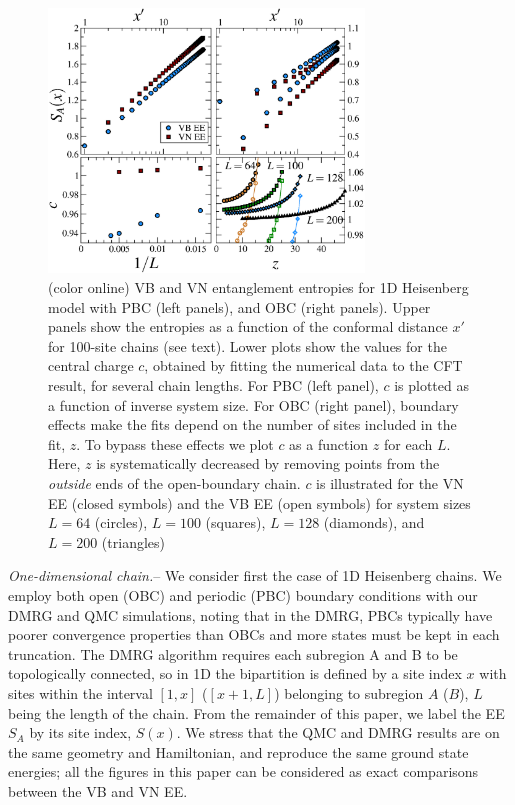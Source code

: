\documentclass[prl,aps,twocolumn,floatfix,amsmath,amssymb,superscriptaddress,tightenlines]{revtex4}
\begin{document}
\begin{figure} {
\includegraphics[width=3.3in]{4-panelFIG1.eps} \caption{(color online) VB
and VN entanglement entropies for 1D Heisenberg model with PBC (left
panels), and OBC (right panels). Upper panels show the entropies as a
function of the conformal distance $x'$ for 100-site chains (see text).
Lower plots show the values for the central charge $c$, obtained by
fitting the numerical data to the CFT result, for several chain lengths.
For PBC (left panel), $c$ is plotted as a function of inverse system size.
For OBC (right panel), boundary effects make the fits depend on the number
of sites included in the fit, $z$. To bypass these effects we plot $c$ as
a function $z$ for each $L$. Here, $z$ is systematically decreased by
removing points from the {\it outside} ends of the open-boundary chain.
$c$ is illustrated for the VN EE (closed symbols) and the VB EE (open
symbols) for system sizes $L=64$ (circles), $L=100$ (squares), $L=128$
(diamonds), and $L=200$ (triangles) \label{1D}}} \end{figure}

{\it One-dimensional chain.}-- We consider first the case of 1D Heisenberg
chains. We employ both open (OBC) and periodic (PBC) boundary conditions
with our DMRG and QMC simulations,
noting that in the DMRG, PBCs typically have poorer convergence properties than OBCs
and more states must be kept in each truncation.
% 
The DMRG algorithm requires each subregion A and B to be topologically
connected, so in 1D the bipartition is defined by a site index $x$ with
sites within the interval $[1,x]$ ($[x+1,L]$) belonging to subregion $A$
($B$), $L$ being the length of the chain. 
From the remainder of this paper, we label the EE $S_A$ by its site index, $S(x)$.
%
We stress that the QMC and DMRG
results are on the same geometry and Hamiltonian, and reproduce the same
ground state energies; all the figures in this paper can be considered as
exact comparisons between the VB and VN EE. 
\end{document}
